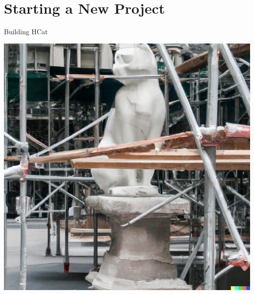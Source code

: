 \documentclass[10pt, presentation, colorlinks]{beamer}
\begin{document}
\section{Starting a New Project}
\label{sec:org16ad6db}

\begin{frame}[label={sec:org4fd4ff5}]{Building HCat}
\begin{center}
\includegraphics[width=.9\linewidth]{./img/building-hcat.png}
\end{center}
\end{frame}
\end{document}
